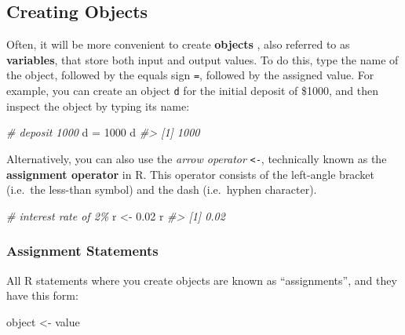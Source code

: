 \documentclass[
]{book}
\newenvironment{Shaded}{\begin{snugshade}}{\end{snugshade}}
\newcommand{\CommentTok}[1]{\textcolor[rgb]{0.56,0.35,0.01}{\textit{#1}}}
\newcommand{\DecValTok}[1]{\textcolor[rgb]{0.00,0.00,0.81}{#1}}
\newcommand{\FloatTok}[1]{\textcolor[rgb]{0.00,0.00,0.81}{#1}}
\newcommand{\NormalTok}[1]{#1}
\newcommand{\OtherTok}[1]{\textcolor[rgb]{0.56,0.35,0.01}{#1}}
\begin{document}
\hypertarget{creating-objects}{%
\subsection{Creating Objects}\label{creating-objects}}

Often, it will be more convenient to create \textbf{objects} , also referred to as \textbf{variables}, that store both input and output values. To do this, type the
name of the object, followed by the equals sign \texttt{=}, followed by the assigned
value. For example, you can create an object \texttt{d} for the initial deposit of
\$1000, and then inspect the object by typing its name:

\begin{Shaded}
\begin{Highlighting}[]
\CommentTok{\# deposit 1000}
\NormalTok{d }\OtherTok{=} \DecValTok{1000}
\NormalTok{d}
\CommentTok{\#\textgreater{} [1] 1000}
\end{Highlighting}
\end{Shaded}

Alternatively, you can also use the \emph{arrow operator} \texttt{\textless{}-}, technically known as
the \textbf{assignment operator} in R. This operator consists of the left-angle
bracket (i.e.~the less-than symbol) and the dash (i.e.~hyphen character).

\begin{Shaded}
\begin{Highlighting}[]
\CommentTok{\# interest rate of 2\%}
\NormalTok{r }\OtherTok{\textless{}{-}} \FloatTok{0.02}
\NormalTok{r}
\CommentTok{\#\textgreater{} [1] 0.02}
\end{Highlighting}
\end{Shaded}

\hypertarget{assignment-statements}{%
\subsubsection*{Assignment Statements}\label{assignment-statements}}

All R statements where you create objects are known as ``assignments'', and they
have this form:

\begin{Shaded}
\begin{Highlighting}[]
\NormalTok{object }\OtherTok{\textless{}{-}}\NormalTok{ value}
\end{Highlighting}
\end{Shaded}
\end{document}
